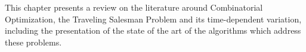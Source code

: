 This chapter presents a review on the literature around Combinatorial Optimization,
the Traveling Salesman Problem and its time-dependent variation,
including the presentation of the state of the art of the algorithms which address these problems.

